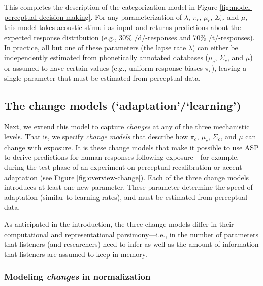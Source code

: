 \documentclass[
  11pt,
  man,floatsintext]{apa6}
\begin{document}
This completes the description of the categorization model in Figure \ref{fig:model-perceptual-decision-making}. For any parameterization of \(\lambda\), \(\pi_c\), \(\mu_c\), \(\Sigma_c\), and \(\mu\), this model takes acoustic stimuli as input and returns predictions about the expected response distribution (e.g., 30\% /d/-responses and 70\% /t/-responses). In practice, all but one of these parameters (the lapse rate \(\lambda\)) can either be independently estimated from phonetically annotated databases (\(\mu_c\), \(\Sigma_c\), and \(\mu\)) or assumed to have certain values (e.g., uniform response biases \(\pi_c\)), leaving a single parameter that must be estimated from perceptual data.

\subsection{The change models (`adaptation'/`learning')}\label{sec:change-models}

Next, we extend this model to capture \emph{changes} at any of the three mechanistic levels. That is, we specify \emph{change models} that describe how \(\pi_c\), \(\mu_c\), \(\Sigma_c\), and \(\mu\) can change with exposure. It is these change models that make it possible to use ASP to derive predictions for human responses following exposure---for example, during the test phase of an experiment on perceptual recalibration or accent adaptation (see Figure \ref{fig:overview-change}). Each of the three change models introduces at least one new parameter. These parameter determine the speed of adaptation (similar to learning rates), and must be estimated from perceptual data.

As anticipated in the introduction, the three change models differ in their computational and representational parsimony---i.e., in the number of parameters that listeners (and researchers) need to infer as well as the amount of information that listeners are assumed to keep in memory.

\subsubsection{\texorpdfstring{Modeling \emph{changes} in normalization}{Modeling changes in normalization}}\label{sec:change-normalization}
\end{document}
